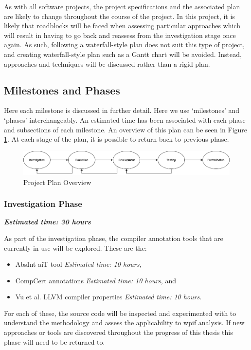 \documentclass[twocolumn]{article}
\begin{document}
As with all software projects, the project specifications and the associated plan are likely to change throughout the course of the project. In this project, it is likely that roadblocks will be faced when assessing particular approaches which will result in having to go back and reassess from the investigation stage once again. As such, following a waterfall-style plan does not suit this type of project, and creating waterfall-style plan such as a Gantt chart will be avoided. Instead, approaches and techniques will be discussed rather than a rigid plan. 

\subsection{Milestones and Phases}
Here each milestone is discussed in further detail. Here we use `milestones' and `phases' interchangeably. An estimated time has been associated with each phase and subsections of each milestone.  An overview of this plan can be seen in Figure \ref{fig:plan}. At each stage of the plan, it is possible to return back to previous phase.

\begin{figure}
    \centering
    \includegraphics[width=\linewidth]{plan.png}
    \caption{Project Plan Overview}
    \label{fig:plan}
\end{figure}

\subsubsection{Investigation Phase}
\label{section:investigation}
\textbf{\textit{Estimated time: 30 hours}}

As part of the investigation phase, the compiler annotation tools that are currently in use will be explored. These are the:
\begin{itemize}
    \item AbsInt aiT tool \textit{Estimated time: 10 hours},
    \item CompCert annotations \textit{Estimated time: 10 hours}, and
    \item Vu et al. LLVM compiler properties \textit{Estimated time: 10 hours}.
\end{itemize}

For each of these, the source code will be inspected and experimented with to understand the methodology and assess the applicability to wpif analysis. If new approaches or tools are discovered throughout the progress of this thesis this phase will need to be returned to.\\
\end{document}

